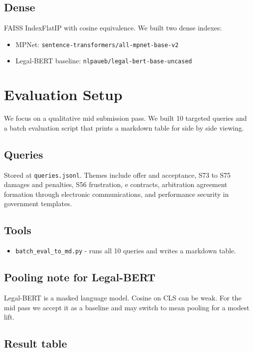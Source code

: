 \documentclass[11pt]{article}
\begin{document}
\subsection{Dense}
FAISS IndexFlatIP with cosine equivalence. We built two dense indexes:
\begin{itemize}[leftmargin=1.2em]
  \item MPNet: \texttt{sentence-transformers/all-mpnet-base-v2}
  \item Legal-BERT baseline: \texttt{nlpaueb/legal-bert-base-uncased}
\end{itemize}

\section{Evaluation Setup}
We focus on a qualitative mid submission pass. We built 10 targeted queries and a batch evaluation script that prints a markdown table for side by side viewing.

\subsection{Queries}
Stored at \texttt{queries.jsonl}. Themes include offer and acceptance, S73 to S75 damages and penalties, S56 frustration, e contracts, arbitration agreement formation through electronic communications, and performance security in government templates.

\subsection{Tools}
\begin{itemize}[leftmargin=1.2em]
  \item \texttt{batch\_eval\_to\_md.py} - runs all 10 queries and writes a markdown table.
\end{itemize}

\subsection{Pooling note for Legal-BERT}
Legal-BERT is a masked language model. Cosine on CLS can be weak. For the mid pass we accept it as a baseline and may switch to mean pooling for a modest lift.

\subsection{Result table}
\end{document}
